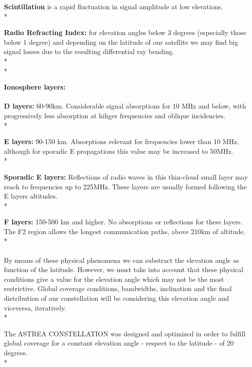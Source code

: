 \documentclass{article}
\begin{document}
\textendash\textbf{ Scintillation } is a rapid fluctuation in signal amplitude at low elevations. \\*

\textendash\textbf{ Radio Refracting Index: } for elevation angles below 3 degrees (especially those below 1 degree) and depending on the latitude of our satellite we may find big signal losses due to the resulting differential ray bending.\\*\\*


\textendash\textbf{ Ionosphere layers: }
\paragraph{  }

\textbf{D layers:} 60-90km. Considerable signal absorptions for 10 MHz and below, with progressively less absorption at hihger frequencies and oblique incidencies.\\*

\textbf{E layers:} 90-150 km. Absorptions relevant for frequencies lower than 10 MHz, although for sporadic E propagations this value may be increased to 50MHz.  \\*

\textbf{Sporadic E layers:} Reflections of radio waves in this thin-cloud small layer may reach to frequencies up to 225MHz. These layers are usually formed following the E layers altitudes. \\*

\textbf{F layers:} 150-500 km and higher. No absorptions or reflections for these layers. The F2 region allows the longest communication paths, above 210km of altitude. \\* 

\paragraph{}

By means of these physical phenomena we can substract the elevation angle as function of the latitude. However, we must take into account that these physical conditions give a value for the elevation angle which may not be the most restrictive. Global coverage conditions, bandwidths, inclination and the final distribution of our constellation will be considering this elevation angle and viceversa, iteratively. \\*

The ASTREA CONSTELLATION was designed and optimized in order to fulfill global coverage for a constant elevation angle - respect to the latitude - of 20 degrees.\\* 
\end{document}
